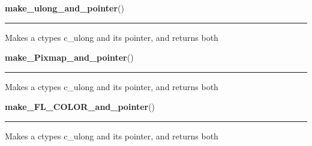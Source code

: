     \label{xformslib:library:make_ulong_and_pointer}

    \vspace{0.5ex}

\hspace{.8\funcindent}\begin{boxedminipage}{\funcwidth}

    \raggedright \textbf{make\_ulong\_and\_pointer}()

    \vspace{-1.5ex}

    \rule{\textwidth}{0.5\fboxrule}
\setlength{\parskip}{2ex}
    Makes a ctypes c\_ulong and its pointer, and returns both

\setlength{\parskip}{1ex}
    \end{boxedminipage}

    \label{xformslib:library:make_ulong_and_pointer}

    \vspace{0.5ex}

\hspace{.8\funcindent}\begin{boxedminipage}{\funcwidth}

    \raggedright \textbf{make\_Pixmap\_and\_pointer}()

    \vspace{-1.5ex}

    \rule{\textwidth}{0.5\fboxrule}
\setlength{\parskip}{2ex}
    Makes a ctypes c\_ulong and its pointer, and returns both

\setlength{\parskip}{1ex}
    \end{boxedminipage}

    \label{xformslib:library:make_ulong_and_pointer}

    \vspace{0.5ex}

\hspace{.8\funcindent}\begin{boxedminipage}{\funcwidth}

    \raggedright \textbf{make\_FL\_COLOR\_and\_pointer}()

    \vspace{-1.5ex}

    \rule{\textwidth}{0.5\fboxrule}
\setlength{\parskip}{2ex}
    Makes a ctypes c\_ulong and its pointer, and returns both

\setlength{\parskip}{1ex}
    \end{boxedminipage}

